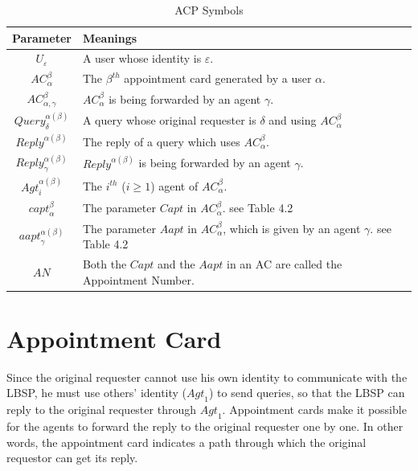 \begin{table} [hbtp]
\caption{ACP Symbols}
\label{table:ACPSymbols}
\centering
\tabulinesep=2mm
\begin{tabu}{|c|l|} \hline 
Parameter & Meanings \\ \hline 
${U}_{\varepsilon}$ & A user whose identity is $\varepsilon$. \\ \hline 
${AC}_{\alpha}^{\beta}$ & The $\beta^{th}$ appointment card generated by a user $\alpha$. \\ \hline 
${AC}_{{\alpha},{\gamma}}^{\beta}$ & ${AC}_{\alpha}^{\beta}$ is being forwarded by an agent $\gamma$. \\ \hline 
${Query}_{\delta}^{{\alpha}\left({\beta}\right)}$ & A query whose original requester is $\delta$ and using ${AC}_{\alpha}^{\beta}$ \\ \hline 
${{Reply}}^{{\alpha}\left({\beta}\right)}$ & The reply of a query which uses ${AC}_{\alpha}^{\beta}$. \\ \hline 
${{Reply}}_{\gamma}^{{\alpha}\left({\beta}\right)}$ & ${Reply}^{\alpha\left(\beta\right)}$ is being forwarded by an agent $\gamma$. \\ \hline 
${{Agt}}_{i}^{{\alpha}\left({\beta}\right)}$ & The $i^{th}$ ($i\geq1$) agent of ${AC}_{\alpha}^{\beta}$. \\ \hline 
${{capt}}_{\alpha}^{\beta}$ & The parameter $Capt$ in ${AC}_\alpha^\beta$. see Table 4.2 \\ \hline 
${{aapt}}_{\gamma}^{{\alpha}\left({\beta}\right)}$ & The parameter $Aapt$ in ${AC}_{\alpha}^{\beta}$, which is given by an agent $\gamma$. see Table 4.2 \\ \hline 
$AN$ & Both the $Capt$ and the $Aapt$ in an AC are called the Appointment Number. \\ \hline 
\end{tabu}
\end{table}

\section{ Appointment Card}

\noindent Since the original requester cannot use his own identity to communicate with the LBSP, he must use others' identity (${Agt}_1$) to send queries, so that the LBSP can reply to the original requester through ${Agt}_1$. Appointment cards make it possible for the agents to forward the reply to the original requester one by one. In other words, the appointment card indicates a path through which the original requestor can get its reply. 

